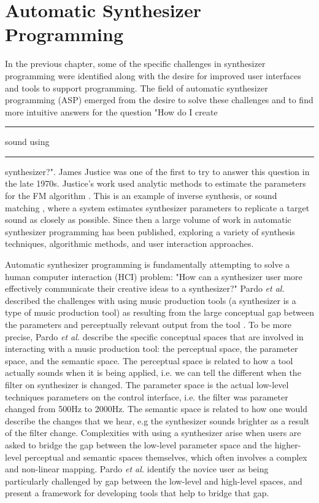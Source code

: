 \chapter{Automatic Synthesizer Programming}
\label{chapter:asp-background}
In the previous chapter, some of the specific challenges in synthesizer programming were identified along with the desire for improved user interfaces and tools to support programming. The field of automatic synthesizer programming (ASP) emerged from the desire to solve these challenges and to find more intuitive answers for the question "How do I create \rule{1cm}{0.15mm} sound using \rule{1cm}{0.15mm} synthesizer?". James Justice \cite{justice1979analytic} was one of the first to try to answer this question in the late 1970s. Justice's work used analytic methods to estimate the parameters for the FM algorithm \cite{chowning1973synthesis}. This is an example of inverse synthesis, or sound matching \cite{horner1993machine}, where a system estimates synthesizer parameters to replicate a target sound as closely as possible. Since then a large volume of work in automatic synthesizer programming has been published, exploring a variety of synthesis techniques, algorithmic methods, and user interaction approaches.

Automatic synthesizer programming is fundamentally attempting to solve a human computer interaction (HCI) problem: "How can a synthesizer user more effectively communicate their creative ideas to a synthesizer?" Pardo \textit{et al.} described the challenges with using music production tools (a synthesizer is a type of music production tool) as resulting from the large conceptual gap between the parameters and perceptually relevant output from the tool \cite{pardo2019learning}. To be more precise, Pardo \textit{et al.} describe the specific conceptual spaces that are involved in interacting with a music production tool: the perceptual space, the parameter space, and the semantic space. The perceptual space is related to how a tool actually sounds when it is being applied, i.e. we can tell the different when the filter on synthesizer is changed. The parameter space is the actual low-level techniques parameters on the control interface, i.e. the filter was parameter changed from 500Hz to 2000Hz. The semantic space is related to how one would describe the changes that we hear, e.g the synthesizer sounds brighter as a result of the filter change. Complexities with using a synthesizer arise when users are asked to bridge the gap between the low-level parameter space and the higher-level perceptual and semantic spaces themselves, which often involves a complex and non-linear mapping. Pardo \textit{et al.} identify the novice user as being particularly challenged by gap between the low-level and high-level spaces, and present a framework for developing tools that help to bridge that gap. 

